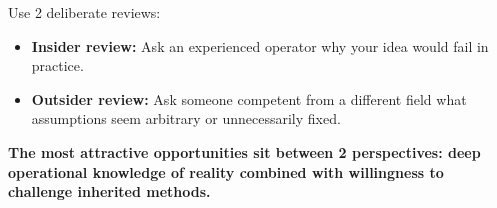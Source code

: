 Use 2 deliberate reviews:

\begin{itemize}[leftmargin=11pt,itemsep=1.5pt,topsep=1.5pt,parsep=0pt]
  \item \textbf{Insider review:} Ask an experienced operator why your idea would fail in practice.
  \item \textbf{Outsider review:} Ask someone competent from a different field what assumptions seem arbitrary or unnecessarily fixed.
\end{itemize}

\textbf{The most attractive opportunities sit between 2 perspectives: deep operational knowledge of reality combined with willingness to challenge inherited methods.}
